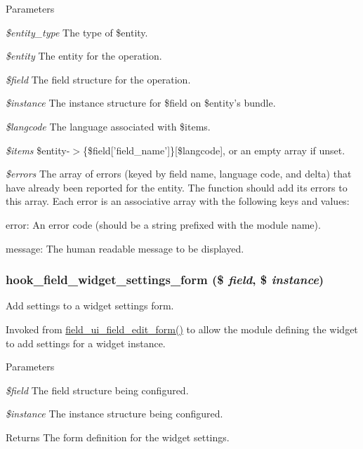 \begin{DoxyParams}{Parameters}
\item[{\em \$entity\_\-type}]The type of \$entity. \item[{\em \$entity}]The entity for the operation. \item[{\em \$field}]The field structure for the operation. \item[{\em \$instance}]The instance structure for \$field on \$entity's bundle. \item[{\em \$langcode}]The language associated with \$items. \item[{\em \$items}]\$entity-\/$>$\{\$field\mbox{[}'field\_\-name'\mbox{]}\}\mbox{[}\$langcode\mbox{]}, or an empty array if unset. \item[{\em \$errors}]The array of errors (keyed by field name, language code, and delta) that have already been reported for the entity. The function should add its errors to this array. Each error is an associative array with the following keys and values:
\begin{DoxyItemize}
\item error: An error code (should be a string prefixed with the module name).
\item message: The human readable message to be displayed. 
\end{DoxyItemize}\end{DoxyParams}
\hypertarget{group__field__types_gabe5ece2134d0cbdfc3c4793f24c5866c}{
\subsubsection[{hook\_\-field\_\-widget\_\-settings\_\-form}]{\setlength{\rightskip}{0pt plus 5cm}hook\_\-field\_\-widget\_\-settings\_\-form (\$ {\em field}, \/  \$ {\em instance})}}
\label{group__field__types_gabe5ece2134d0cbdfc3c4793f24c5866c}
Add settings to a widget settings form.

Invoked from \hyperlink{group__forms_ga11660e91b3649ff30bf665c00f1a9af2}{field\_\-ui\_\-field\_\-edit\_\-form()} to allow the module defining the widget to add settings for a widget instance.


\begin{DoxyParams}{Parameters}
\item[{\em \$field}]The field structure being configured. \item[{\em \$instance}]The instance structure being configured.\end{DoxyParams}
\begin{DoxyReturn}{Returns}
The form definition for the widget settings. 
\end{DoxyReturn}
